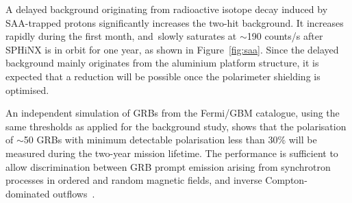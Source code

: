 \documentclass[galaxies,article,accept,moreauthors,pdftex,10pt,a4paper]{mdpi}
\begin{document}
A delayed background originating from radioactive isotope decay induced by SAA-trapped protons significantly increases the two-hit background. It increases rapidly during the first month, and~slowly saturates at $\sim$190 counts/s after SPHiNX is in orbit for one year, as shown in Figure~\ref{fig:saa}.
Since the delayed background mainly originates from the aluminium platform structure, it is expected that a reduction will be possible once the polarimeter shielding is optimised.

An independent simulation of GRBs from the Fermi/GBM catalogue, using the same thresholds as applied for the background study, shows that the polarisation of $\sim$50 GRBs with minimum detectable polarisation less than 30\% will be measured during the two-year mission lifetime.
The performance is sufficient to allow discrimination between GRB prompt emission arising from synchrotron processes in ordered and random magnetic fields, and inverse Compton-dominated outflows~\cite{ref:sphinx}. %


\vspace{6pt}




\end{document}

